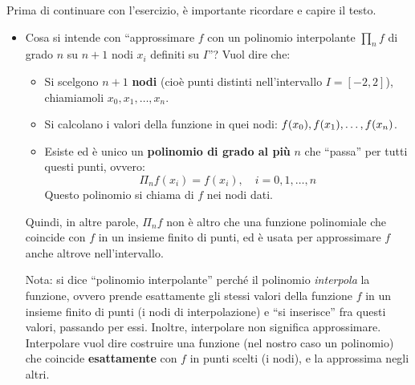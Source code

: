 \begin{remarkbox}
    Prima di continuare con l'esercizio, è importante ricordare e capire il testo.
    \begin{itemize}
        \item Cosa si intende con ``approssimare $f$ con un polinomio interpolante $\prod_{n} f$ di grado $n$ su $n+1$ nodi $x_{i}$ definiti su $I$''? Vuol dire che:
        \begin{itemize}
            \item Si scelgono $n+1$ \textbf{nodi} (cioè punti distinti nell'intervallo $I = [-2, 2]$), chiamiamoli $x_0, x_1, \dots, x_n$.
            \item Si calcolano i valori della funzione in quei nodi: $f(x_0), f(x_1),\break \dots, f(x_n)$.
            \item Esiste ed è unico un \textbf{polinomio di grado al più} $n$ che ``passa'' per tutti questi punti, ovvero:
            \begin{equation*}
                \Pi_{n} f(x_i) = f(x_i), \quad i = 0, 1, \dots, n
            \end{equation*}
            Questo polinomio si chiama  di $f$ nei nodi dati.
        \end{itemize}
        Quindi, in altre parole, $\Pi_{n} f$ non è altro che una funzione polinomiale che coincide con $f$ in un insieme finito di punti, ed è usata per approssimare $f$ anche altrove nell'intervallo.

        \highspace
        Nota: si dice ``polinomio interpolante'' perché il polinomio \emph{interpola} la funzione, ovvero prende esattamente gli stessi valori della funzione $f$ in un insieme finito di punti (i nodi di interpolazione) e ``si inserisce'' fra questi valori, passando per essi. Inoltre, interpolare non significa approssimare. Interpolare vuol dire costruire una funzione (nel nostro caso un polinomio) che coincide \textbf{esattamente} con $f$ in punti scelti (i nodi), e la approssima negli altri.


\end{itemize}
\end{remarkbox}
